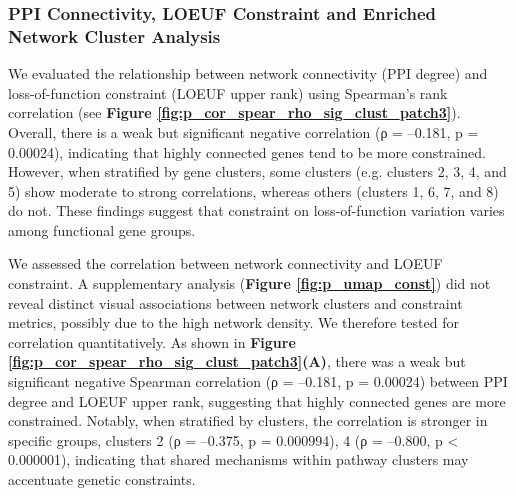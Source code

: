 \subsubsection{PPI Connectivity, LOEUF Constraint and Enriched Network Cluster Analysis}
We evaluated the relationship between network connectivity (PPI degree) and loss-of-function constraint (LOEUF upper rank) using Spearman’s rank correlation (see \textbf{Figure \ref{fig:p_cor_spear_rho_sig_clust_patch3}}). Overall, there is a weak but significant negative correlation (ρ = –0.181, p = 0.00024), indicating that highly connected genes tend to be more constrained. However, when stratified by gene clusters, some clusters (e.g. clusters 2, 3, 4, and 5) show moderate to strong correlations, whereas others (clusters 1, 6, 7, and 8) do not. These findings suggest that constraint on loss-of-function variation varies among functional gene groups.

We assessed the correlation between network connectivity and LOEUF constraint. 
A supplementary analysis (\textbf{Figure \ref{fig:p_umap_const}}) did not reveal distinct visual associations between network clusters and constraint metrics, possibly due to the high network density.
We therefore tested for correlation quantitatively. As shown in \textbf{Figure \ref{fig:p_cor_spear_rho_sig_clust_patch3}(A)}, there was a weak but significant negative Spearman correlation (ρ = –0.181, p = 0.00024) between PPI degree and LOEUF upper rank, suggesting that highly connected genes are more constrained. Notably, when stratified by clusters, the correlation is stronger in specific groups, clusters 2 (ρ = –0.375, p = 0.000994), 4 (ρ = –0.800, p < 0.000001), indicating that shared mechanisms within pathway clusters may accentuate genetic constraints.


